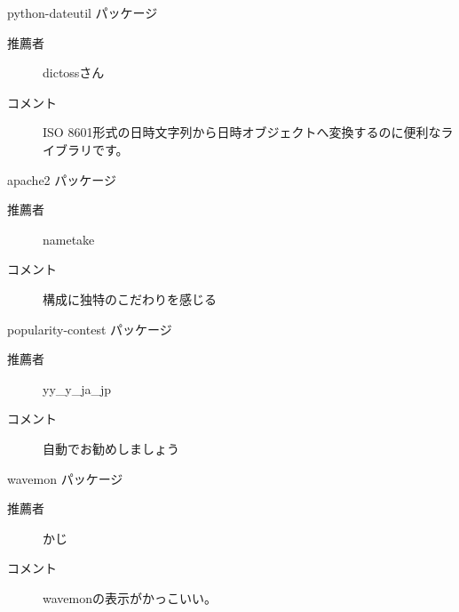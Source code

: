 \begin{frame}{python-dateutil パッケージ}

  \begin{description}
    \item [推薦者] dictossさん
  　\item [コメント] ISO 8601形式の日時文字列から日時オブジェクトへ変換するのに便利なライブラリです。
  \end{description}

\end{frame}

\begin{frame}{apache2 パッケージ}

  \begin{description}
    \item [推薦者] nametake
  　\item [コメント] 構成に独特のこだわりを感じる
  \end{description}

\end{frame}

\begin{frame}{popularity-contest パッケージ}

  \begin{description}
    \item [推薦者] yy\_y\_ja\_jp
  　\item [コメント] 自動でお勧めしましょう
  \end{description}

\end{frame}

\begin{frame}{wavemon パッケージ}

  \begin{description}
    \item [推薦者] かじ
  　\item [コメント] wavemonの表示がかっこいい。
  \end{description}

\end{frame}

